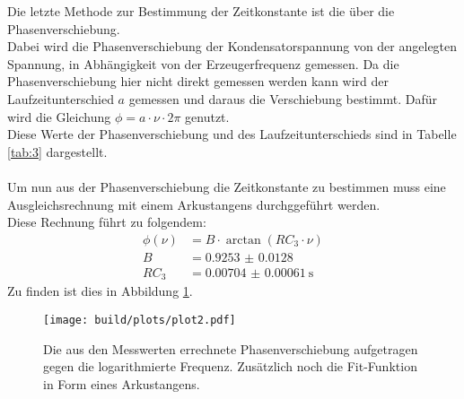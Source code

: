 \noindent Die letzte Methode zur Bestimmung der Zeitkonstante ist die über die Phasenverschiebung.\\ 
Dabei wird die Phasenverschiebung der Kondensatorspannung von der angelegten Spannung, in Abhängigkeit von der Erzeugerfrequenz gemessen.
Da die Phasenverschiebung hier nicht direkt gemessen werden kann wird der Laufzeitunterschied $a$ gemessen und daraus die Verschiebung bestimmt.
Dafür wird die Gleichung $\phi= a\cdot\nu\cdot 2\pi$ genutzt.\\
Diese Werte der Phasenverschiebung und des Laufzeitunterschieds sind in Tabelle \ref{tab:3} dargestellt.\\\\
\noindent Um nun aus der Phasenverschiebung die Zeitkonstante zu bestimmen muss eine Ausgleichsrechnung mit einem Arkustangens durchggeführt werden.\\
Diese Rechnung führt zu folgendem:
\begin{align*}
    \phi(\nu)&=B\cdot \arctan(RC_3 \cdot \nu)\\
    B&=\SI{0.9253(128)}{}\\
    RC_3&=\SI{0.00704(61)}{\second}
\end{align*}
Zu finden ist dies in Abbildung \ref{img:3}.

\begin{figure}[H]
    \centering
    \texttt{[image: build/plots/plot2.pdf]}
    \caption{Die aus den Messwerten errechnete Phasenverschiebung aufgetragen gegen die logarithmierte Frequenz. Zusätzlich noch die Fit-Funktion in Form eines Arkustangens. }
    \label{img:3}
\end{figure}

